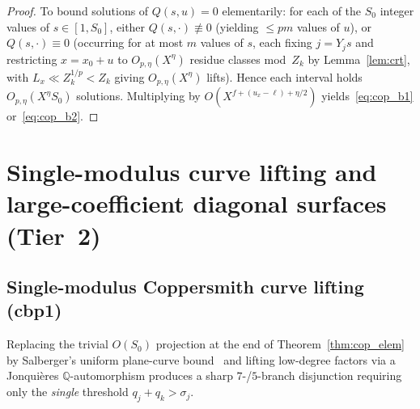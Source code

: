 \documentclass[11pt,a4paper]{amsart}
\theoremstyle{plain}
\theoremstyle{definition}
\theoremstyle{remark}
\newcommand{\Q}{\mathbb{Q}}
\begin{document}
\begin{proof}
To bound solutions of $Q(s, u) = 0$ elementarily: for each of the $S_0$ integer values of $s \in [1, S_0]$, either $Q(s, \cdot) \not\equiv 0$ (yielding $\le p m$ values of $u$), or $Q(s, \cdot) \equiv 0$ (occurring for at most $m$ values of $s$, each fixing $j = Y_j s$ and restricting $x = x_0 + u$ to $O_{p,\eta}(X^\eta)$ residue classes mod~$Z_k$ by Lemma~\ref{lem:crt}, with $L_x \ll Z_k^{1/p} < Z_k$ giving $O_{p,\eta}(X^\eta)$ lifts). Hence each interval holds $O_{p,\eta}(X^\eta S_0)$ solutions. Multiplying by $O(X^{f + (u_x - \ell) + \eta/2})$ yields~\eqref{eq:cop_b1} or~\eqref{eq:cop_b2}.
\end{proof}

\section{Single-modulus curve lifting and large-coefficient diagonal surfaces (Tier~2)}\label{sec:tier2}

\subsection{Single-modulus Coppersmith curve lifting (\textsf{cbp1})}

Replacing the trivial $O(S_0)$ projection at the end of Theorem~\ref{thm:cop_elem} by Salberger's uniform plane-curve bound~\cite[Theorem~1.2]{Salberger2023} and lifting low-degree factors via a Jonqui\`eres $\Q$-automorphism produces a sharp $7$-/$5$-branch disjunction requiring only the \emph{single} threshold $q_j + q_k > \sigma_j$.
\end{document}
